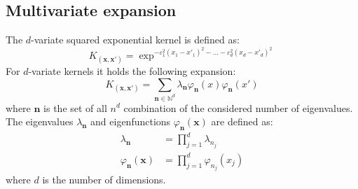 \documentclass[10pt,a4paper,twocolumn]{article}
\begin{document}
\subsection{Multivariate expansion}
The $d$-variate squared exponential kernel is defined as:
\begin{equation}
	K_{(\mathbf{x}, \mathbf{x'})} = \exp^{-\varepsilon_1^2\left(x_1 - x'_1\right)^2  - \ldots - \varepsilon_d^2\left(x_d - x'_d\right)^2}
\end{equation}
For $d$-variate kernels it holds the following expansion:
\begin{equation}
	K_{(\mathbf{x},\mathbf{x'})} =  \sum_{\mathbf{n}\in \mathbb{N}^d} \lambda_{\mathbf{n}} \varphi_{\mathbf{n}}(x) \varphi_{\mathbf{n}}(x')
	\end{equation}
where $\mathbf{n}$ is the set of all $n^d$ combination of the considered number of eigenvalues.
The eigenvalues $\lambda_{\mathbf{n}}$ and eigenfunctions $\varphi_{\mathbf{n}}(\mathbf{x})$ are defined as:
\begin{align}
	\lambda_{\mathbf{n}} &= \prod_{j=1}^{d} \lambda_{n_j} \\
	\varphi_{\mathbf{n}}(\mathbf{x}) &= \prod_{j=1}^{d} \varphi_{n_{j}}(x_j)
\end{align}
where $d$ is the number of dimensions. 
	
\end{document}
